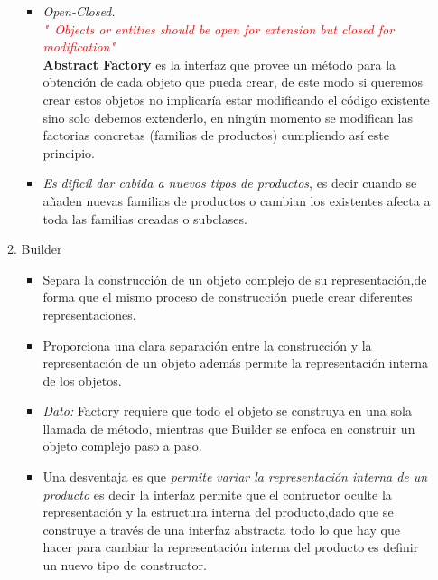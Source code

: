 \documentclass[a4paper,10pt]{article}
\begin{document}
\begin{enumerate}
\begin{enumerate}
\begin{itemize}
                \item [\Checkmark] \textit{Open-Closed.} \\
                \textcolor{red}{\textit{ "\ Objects or entities should be open for extension but closed for modification"}}\\
                \textbf{Abstract Factory }es la interfaz que provee un método para la obtención de cada objeto que pueda crear, de este modo si queremos crear estos objetos no implicaría estar modificando el código existente 
                sino solo debemos extenderlo, en ningún momento se modifican las factorias concretas (familias de productos) cumpliendo así este principio.
                      
                \item [\XSolidBrush ] \textit{Es dificíl dar cabida a nuevos tipos de productos}, es decir cuando se añaden nuevas familias de productos o cambian los existentes afecta a toda las familias creadas o subclases.
                       
            \end{itemize}  
            

            \item \colorbox[rgb]{0.69, 0.61, 0.85}{Builder}
            \begin{itemize}

                \item [\Checkmark] Separa la construcción de un objeto complejo de su representación,de forma que el mismo proceso de construcción puede crear diferentes representaciones.

                \item [\Checkmark] Proporciona una clara separación entre la construcción y la representación de un objeto además permite la representación interna de los objetos.\\
                
                \item [\PencilRightDown] \textit{Dato:} Factory requiere que todo el objeto se construya en una sola llamada de método, mientras que Builder se enfoca en construir un objeto complejo paso a paso.\\
            
                \item [\XSolidBrush ] Una desventaja es que \textit{permite variar la representación interna de un producto} es decir la interfaz permite que el
                      contructor oculte la representación y la estructura interna del producto,dado que se construye a través de una interfaz abstracta todo lo que hay 
                      que hacer para cambiar la representación interna del producto es definir un nuevo tipo de constructor.
            \end{itemize}
            

\end{enumerate}
\end{enumerate}
\end{document}
